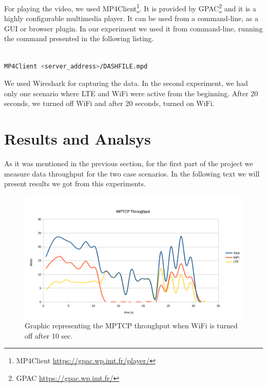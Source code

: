 \documentclass{llncs}
\begin{document}
For playing the video, we used MP4Client\footnote{MP4Client \url{https://gpac.wp.imt.fr/player/}}. It is provided by GPAC\footnote{GPAC \url{https://gpac.wp.imt.fr/}} and it is a highly configurable multimedia player. It can be used from a command-line, as a GUI or browser plugin. In our experiment we used it from command-line, running the command presented in the following listing.

\begin{lstlisting}[language=bash, caption={\label{l:cmd}Command for running MP4Client player.}, captionpos=b]

MP4Client <server_address>/DASHFILE.mpd

\end{lstlisting} 

We used Wireshark for capturing the data. In the second experiment, we had only one scenario where LTE and WiFi were active from the beginning. After 20 seconds, we turned off WiFi and after 20 seconds, turned on WiFi. 

\section{Results and Analsys}
As it was mentioned in the previous section, for the first part of the project we measure data throughput for the two case scenarios. In the following text we will present results we got from this experiments.

\begin{figure}[H]
\centering
\includegraphics[width=1.0\textwidth]{result1.png}
\caption{\label{fig:r1} Graphic representing the MPTCP throughput when WiFi is turned off after 10 sec.}
\end{figure}
\end{document}
